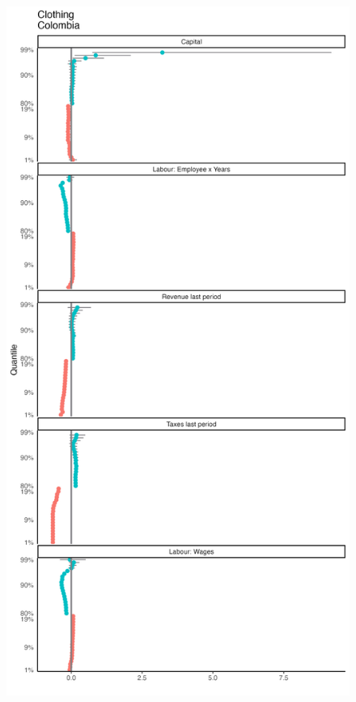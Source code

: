 \documentclass[
  12pt]{article}
\theoremstyle{definition}
\theoremstyle{remark}
\begin{document}
\begin{figure}

{\centering \includegraphics[width=\textwidth,height=1\textheight]{../Results/Figures/Colombia/322_by_size_diff.png}

}

\end{figure}
\end{document}
